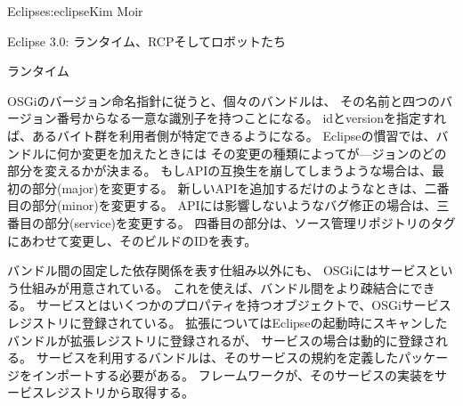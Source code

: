 \begin{aosachapter}{Eclipse}{s:eclipse}{Kim Moir}
\begin{aosasect1}{Eclipse 3.0: ランタイム、RCPそしてロボットたち}
\begin{aosasect2}{ランタイム}

OSGiのバージョン命名指針に従うと、個々のバンドルは、
その名前と四つのバージョン番号からなる一意な識別子を持つことになる。
idとversionを指定すれば、あるバイト群を利用者側が特定できるようになる。
Eclipseの慣習では、バンドルに何か変更を加えたときには
その変更の種類によってが—ジョンのどの部分を変えるかが決まる。
もしAPIの互換生を崩してしまうような場合は、最初の部分(major)を変更する。
新しいAPIを追加するだけのようなときは、二番目の部分(minor)を変更する。
APIには影響しないようなバグ修正の場合は、三番目の部分(service)を変更する。
四番目の部分は、ソース管理リポジトリのタグにあわせて変更し、そのビルドのIDを表す。

バンドル間の固定した依存関係を表す仕組み以外にも、
OSGiにはサービスという仕組みが用意されている。
これを使えば、バンドル間をより疎結合にできる。
サービスとはいくつかのプロパティを持つオブジェクトで、OSGiサービスレジストリに登録されている。
拡張についてはEclipseの起動時にスキャンしたバンドルが拡張レジストリに登録されるが、
サービスの場合は動的に登録される。
サービスを利用するバンドルは、そのサービスの規約を定義したパッケージをインポートする必要がある。
フレームワークが、そのサービスの実装をサービスレジストリから取得する。


\end{aosasect2}
\end{aosasect1}
\end{aosachapter}
